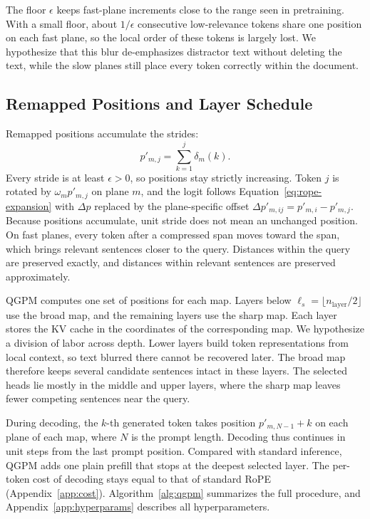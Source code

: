 \documentclass[11pt]{article}
\begin{document}
The floor $\epsilon$ keeps fast-plane increments close to the range seen in pretraining. With a small floor, about $1/\epsilon$ consecutive low-relevance tokens share one position on each fast plane, so the local order of these tokens is largely lost. We hypothesize that this blur de-emphasizes distractor text without deleting the text, while the slow planes still place every token correctly within the document.

\subsection{Remapped Positions and Layer Schedule}
\label{sec:method-remapping}

Remapped positions accumulate the strides:
\begin{equation}
p'_{m,j} = \sum_{k=1}^{j} \delta_m(k).
\label{eq:cumsum}
\end{equation}
Every stride is at least $\epsilon > 0$, so positions stay strictly increasing. Token $j$ is rotated by $\omega_m p'_{m,j}$ on plane $m$, and the logit follows Equation~\ref{eq:rope-expansion} with $\Delta p$ replaced by the plane-specific offset $\Delta p'_{m,ij} = p'_{m,i} - p'_{m,j}$. Because positions accumulate, unit stride does not mean an unchanged position. On fast planes, every token after a compressed span moves toward the span, which brings relevant sentences closer to the query. Distances within the query are preserved exactly, and distances within relevant sentences are preserved approximately.

QGPM computes one set of positions for each map. Layers below $\ell_s = \lfloor n_{\mathrm{layer}}/2 \rfloor$ use the broad map, and the remaining layers use the sharp map. Each layer stores the KV cache in the coordinates of the corresponding map. We hypothesize a division of labor across depth. Lower layers build token representations from local context, so text blurred there cannot be recovered later. The broad map therefore keeps several candidate sentences intact in these layers. The selected heads lie mostly in the middle and upper layers, where the sharp map leaves fewer competing sentences near the query.

During decoding, the $k$-th generated token takes position $p'_{m,N-1} + k$ on each plane of each map, where $N$ is the prompt length. Decoding thus continues in unit steps from the last prompt position. Compared with standard inference, QGPM adds one plain prefill that stops at the deepest selected layer. The per-token cost of decoding stays equal to that of standard RoPE (Appendix~\ref{app:cost}). Algorithm~\ref{alg:qgpm} summarizes the full procedure, and Appendix~\ref{app:hyperparams} describes all hyperparameters.
\end{document}

